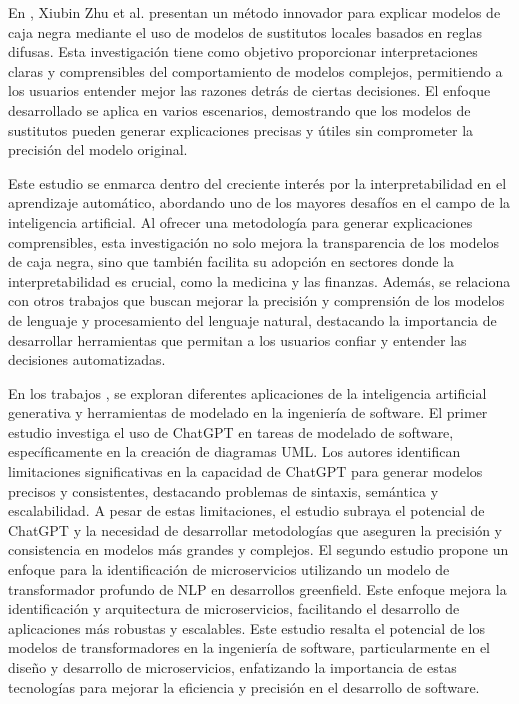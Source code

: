 En \cite{Zhu2023}, Xiubin Zhu et al. presentan un método innovador para explicar modelos de caja negra mediante el uso de modelos de sustitutos locales basados en reglas difusas. Esta investigación tiene como objetivo proporcionar interpretaciones claras y comprensibles del comportamiento de modelos complejos, permitiendo a los usuarios entender mejor las razones detrás de ciertas decisiones. El enfoque desarrollado se aplica en varios escenarios, demostrando que los modelos de sustitutos pueden generar explicaciones precisas y útiles sin comprometer la precisión del modelo original.

Este estudio se enmarca dentro del creciente interés por la interpretabilidad en el aprendizaje automático, abordando uno de los mayores desafíos en el campo de la inteligencia artificial. Al ofrecer una metodología para generar explicaciones comprensibles, esta investigación no solo mejora la transparencia de los modelos de caja negra, sino que también facilita su adopción en sectores donde la interpretabilidad es crucial, como la medicina y las finanzas. Además, se relaciona con otros trabajos que buscan mejorar la precisión y comprensión de los modelos de lenguaje y procesamiento del lenguaje natural, destacando la importancia de desarrollar herramientas que permitan a los usuarios confiar y entender las decisiones automatizadas.

En los trabajos \cite{Cámara2023}\cite{Bajaj2024}\cite{Arif2023}, se exploran diferentes aplicaciones de la inteligencia artificial generativa y herramientas de modelado en la ingeniería de software. El primer estudio \cite{Cámara2023} investiga el uso de ChatGPT en tareas de modelado de software, específicamente en la creación de diagramas UML. Los autores identifican limitaciones significativas en la capacidad de ChatGPT para generar modelos precisos y consistentes, destacando problemas de sintaxis, semántica y escalabilidad. A pesar de estas limitaciones, el estudio subraya el potencial de ChatGPT y la necesidad de desarrollar metodologías que aseguren la precisión y consistencia en modelos más grandes y complejos. El segundo estudio \cite{Bajaj2024} propone un enfoque para la identificación de microservicios utilizando un modelo de transformador profundo de NLP en desarrollos greenfield. Este enfoque mejora la identificación y arquitectura de microservicios, facilitando el desarrollo de aplicaciones más robustas y escalables. Este estudio resalta el potencial de los modelos de transformadores en la ingeniería de software, particularmente en el diseño y desarrollo de microservicios, enfatizando la importancia de estas tecnologías para mejorar la eficiencia y precisión en el desarrollo de software.

